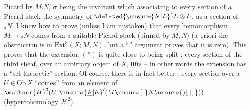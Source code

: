 \margin{\mbox{-- --}}

Picard   by $M.N$, $\sigma$ being the invariant which  associating to every section  of a Picard stack the symmetry of $\deleted{\unsure{N|L}}L\otimes L$,  as a section of ${}_{2}N$. I know how to prove (unless I am mistaken) that every homomorphism $M\to{}_{2}N$ comes from a suitable Picard stack (pinned by $M,N$) (a priori the obstruction is in $\mathrm{Ext}^{3}(X;M,N)$, but a ``'' argument proves that it is zero). This proves that the extension $(*)$ is quite close to being split :  every section of the third sheaf, over an arbitrary object of $X$, lifts -- in other words the extension has a ``set-theoretic'' section. Of course, there is in fact better : every section over a $U\in\mathrm{Ob}\,X$ ``comes'' from an element of $\mathscr{H}^{2}(U,{\unsure{\underline{F}|E}}'(M\unsure{.}N\unsure{)|;|,}))$ (hypercohomology $\mathscr{H}^{2}$).

